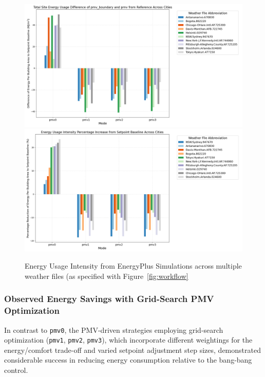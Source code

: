 \begin{figure}[h!]
    \centering
    \includegraphics[width=0.85\linewidth]{figs/pmv_search_weather.png}
    \includegraphics[width=0.85\linewidth]{figs/pmv_search_weather_perc.png}
    \caption{Energy Usage Intensity from EnergyPlus Simulations across multiple weather files (as specified with Figure~\ref{fig:workflow}}
    \label{fig:pmv-grid}
\end{figure}


\subsubsection{Observed Energy Savings with Grid-Search PMV Optimization}

In contrast to \texttt{pmv0}, the PMV-driven strategies employing grid-search optimization (\texttt{pmv1}, \texttt{pmv2}, \texttt{pmv3}), which incorporate different weightings for the energy/comfort trade-off and varied setpoint adjustment step sizes, demonstrated considerable success in reducing energy consumption relative to the bang-bang control.
